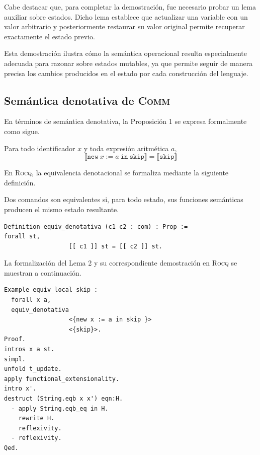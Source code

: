Cabe destacar que, para completar la demostración, fue necesario probar un lema auxiliar sobre estados. Dicho lema establece que actualizar una variable con un valor arbitrario y posteriormente restaurar su valor original permite recuperar exactamente el estado previo. 

Esta demostración ilustra cómo la semántica operacional resulta especialmente adecuada para razonar sobre estados mutables, ya que permite seguir de manera precisa los cambios producidos en el estado por cada construcción del lenguaje.

\subsection{Semántica denotativa de \textsc{Comm}}

En términos de semántica denotativa, la Proposición 1 se expresa formalmente como sigue.

\begin{lema}
Para todo identificador $x$ y toda expresión aritmética $a$, 
\[
\llbracket \mathtt{new}\ x:= a\ \mathtt{in}\ \mathtt{skip} \rrbracket
=
\llbracket \mathtt{skip} \rrbracket
\]
\end{lema}

En \textsc{Rocq}, la equivalencia denotacional se formaliza mediante la siguiente definición.

Dos comandos son equivalentes si, para todo estado, sus funciones semánticas producen el mismo estado resultante.

\begin{lstlisting}[caption={Definición de equivalencia denotativa en Rocq}, basicstyle=\footnotesize \rmfamily
]
Definition equiv_denotativa (c1 c2 : com) : Prop :=  
forall st,
                  [[ c1 ]] st = [[ c2 ]] st.
\end{lstlisting}


La formalización del Lema 2 y su correspondiente demostración en \textsc{Rocq} se muestran a continuación.

\begin{lstlisting}[caption={Programas equivalentes con semántica denotativa en Rocq}, basicstyle=\footnotesize \rmfamily
]
Example equiv_local_skip :
  forall x a,
  equiv_denotativa
                  <{new x := a in skip }>
                  <{skip}>.
Proof.  
intros x a st. 
simpl. 
unfold t_update. 
apply functional_extensionality.
intro x'.
destruct (String.eqb x x') eqn:H.
  - apply String.eqb_eq in H.
    rewrite H. 
    reflexivity.
  - reflexivity.
Qed.
\end{lstlisting}


